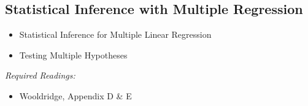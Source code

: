 \documentclass[PS]{syllabus}
\begin{document}
\begin{syllabus}
\subsection{Statistical Inference with Multiple Regression}
\begin{itemize}
\item Statistical Inference for Multiple Linear Regression
\item Testing Multiple Hypotheses
\end{itemize}
\textit{Required Readings:} \begin{itemize}
  \item Wooldridge, Appendix D \& E
\end{itemize}






\end{syllabus}
\end{document}
